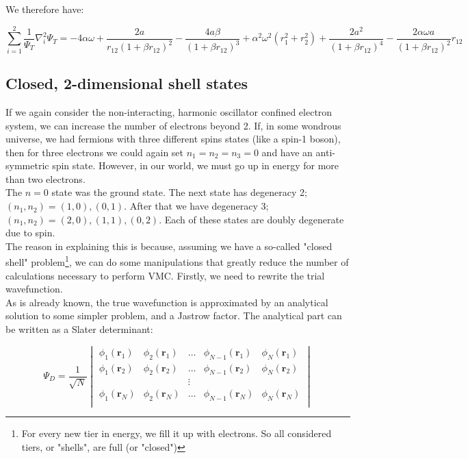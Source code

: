 \documentclass[english, a4paper]{article}
\newcommand{\bm}[1]{\mathbf{#1}}
\begin{document}
	We therefore have:
	
	\begin{equation}
	\sum_{i=1}^2\frac{1}{\Psi_T}\nabla_i^2\Psi_T = -4\alpha\omega + \frac{2a}{r_{12}(1+\beta r_{12})^2} - \frac{4a\beta}{(1+\beta r_{12})^3} + \alpha^2\omega^2(r_1^2 + r_2^2) + \frac{2a^2}{(1+\beta r_{12})^4} - \frac{2\alpha\omega a}{(1+\beta r_{12})^2}r_{12}
	\end{equation}
	
	\subsection{Closed, 2-dimensional shell states}
	If we again consider the non-interacting, harmonic oscillator confined electron system, we can increase the number of electrons beyond 2. If, in some wondrous universe, we had fermions with three different spins states (like a spin-1 boson), then for three electrons we could again set $n_1=n_2=n_3 = 0$ and have an anti-symmetric spin state. However, in our world, we must go up in energy for more than two electrons.\\
	The $n=0$ state was the ground state. The next state has degeneracy 2; $(n_1,n_2) = (1,0), (0,1)$. After that we have degeneracy 3;$(n_1,n_2) = (2,0), (1,1), (0,2)$. Each of these states are doubly degenerate due to spin.\\
	
	The reason in explaining this is because, assuming we have a so-called "closed shell" problem\footnote{For every new tier in energy, we fill it up with electrons. So all considered tiers, or "shells", are full (or "closed")}, we can do some manipulations that greatly reduce the number of calculations necessary to perform VMC. Firstly, we need to rewrite the trial wavefunction.\\
	As is already known, the true wavefunction is approximated by an analytical solution to some simpler problem, and a Jastrow factor. The analytical part can be written as a Slater determinant:
	
	\begin{equation}
	\Psi_{D} = \frac{1}{\sqrt{N}}
	\begin{vmatrix}
	\phi_1(\bm{r}_1) & \phi_2(\bm{r}_1) & \ldots & \phi_{N-1}(\bm{r}_1) & \phi_N(\bm{r}_1)\\
	\phi_1(\bm{r}_2) & \phi_2(\bm{r}_2) & \ldots & \phi_{N-1}(\bm{r}_2) & \phi_N(\bm{r}_2)\\
	& & \vdots & &\\
	\phi_1(\bm{r}_N) & \phi_2(\bm{r}_N) & \ldots & \phi_{N-1}(\bm{r}_N) & \phi_N(\bm{r}_N)\\
	\end{vmatrix}
	\end{equation}
	
\end{document}
